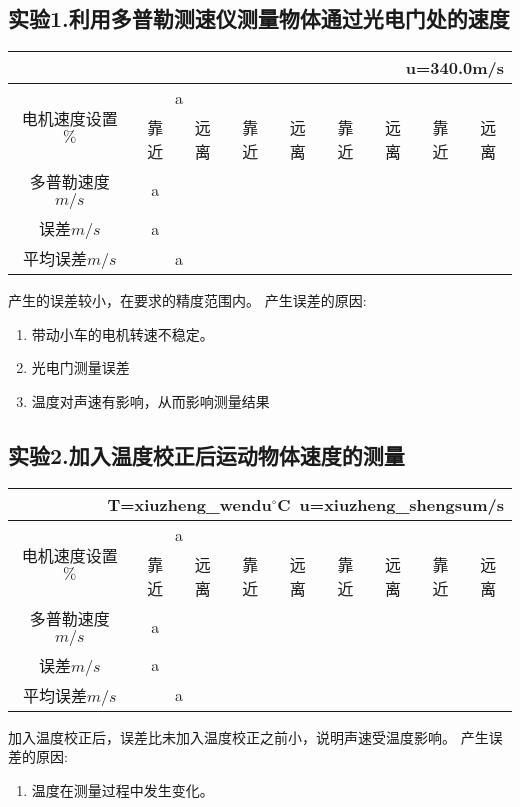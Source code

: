 \subsection*{实验1.利用多普勒测速仪测量物体通过光电门处的速度}
\begin{center}
\begin{tabular}{|c|c|c|c|c|c|c|c|c|}
	\multicolumn{9}{r}{u=340.0m/s}
	\\\hline
	\multirow{2}{*}{电机速度设置\(\%\)}
	{%
		&\multicolumn{2}{|c|}{ {{ a }} } 
	{%
		\\\cline{2-9}
	&靠近&远离&靠近&远离&靠近&远离&靠近&远离
	\\\hline
	多普勒速度\(m/s\)
	{%
		& {{ a }} 
	{%
	\\\hline
	误差\(m/s\)
	{%
		& {{ a }} 
	{%
	\\\hline
	平均误差\(m/s\)
	{%
		& \multicolumn{2}{|c|}{ {{ a }} }
	{%
	\\\hline
\end{tabular}
\end{center}
产生的误差较小，在要求的精度范围内。
产生误差的原因:
\begin{enumerate}
	\itemsep=-5pt
	\item 带动小车的电机转速不稳定。
	\item 光电门测量误差
	\item 温度对声速有影响，从而影响测量结果
\end{enumerate}


\subsection*{实验2.加入温度校正后运动物体速度的测量}
\begin{center}
\begin{tabular}{|c|c|c|c|c|c|c|c|c|}
	\multicolumn{9}{r}{T={{xiuzheng_wendu}}$^{\circ}$C\ u={{xiuzheng_shengsu}}m/s}
	\\\hline
	\multirow{2}{*}{电机速度设置\(\%\)}
	{%
		&\multicolumn{2}{|c|}{ {{ a }} } 
	{%
		\\\cline{2-9}
	&靠近&远离&靠近&远离&靠近&远离&靠近&远离
	\\\hline
	多普勒速度\(m/s\)
	{%
		& {{ a }} 
	{%
	\\\hline
	误差\(m/s\)
	{%
		& {{ a }} 
	{%
	\\\hline
	平均误差\(m/s\)
	{%
		&\multicolumn{2}{|c|}{ {{ a }} }
	{%
	\\\hline
\end{tabular}
\end{center}
加入温度校正后，误差比未加入温度校正之前小，说明声速受温度影响。
产生误差的原因:
\begin{enumerate}
	\itemsep=-5pt
		\item 温度在测量过程中发生变化。
\end{enumerate}


